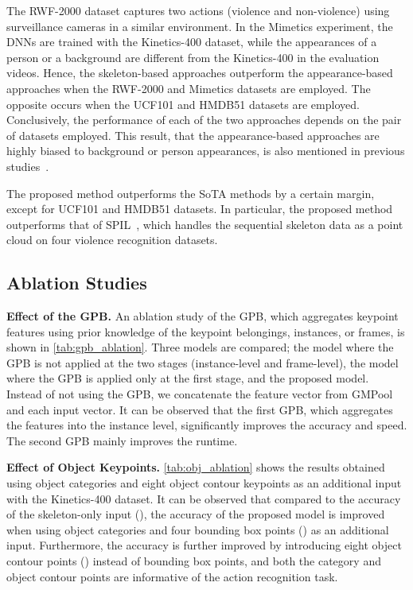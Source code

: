 \documentclass[10pt,twocolumn,letterpaper]{article}
\begin{document}
The RWF-2000 dataset captures two actions (violence and non-violence) using surveillance cameras in a similar environment.
In the Mimetics experiment, the DNNs are trained with the Kinetics-400 dataset, while the appearances of a person or a background are different from the Kinetics-400 in the evaluation videos.
Hence, the skeleton-based approaches outperform the appearance-based approaches when the RWF-2000 and Mimetics datasets are employed. The opposite occurs when the UCF101 and HMDB51 datasets are employed.
Conclusively, the performance of each of the two approaches depends on the pair of datasets employed.
This result, that the appearance-based approaches are highly biased to background or person appearances, is also mentioned in previous studies~\cite{Choi2019Neurips,Weinzaepfel2021IJCV,Moon2021CVPR}.

The proposed method outperforms the SoTA methods by a certain margin, except for UCF101 and HMDB51 datasets.
In particular, the proposed method outperforms that of SPIL~\cite{Su2020ECCV}, which handles the sequential skeleton data as a point cloud on four violence recognition datasets.

\subsection{Ablation Studies}
\label{sec:ablation}

\noindent \textbf{Effect of the GPB.}
An ablation study of the GPB, which aggregates keypoint features using prior knowledge of the keypoint belongings, instances, or frames, is shown in \cref{tab:gpb_ablation}.
Three models are compared; the model where the GPB is not applied at the two stages (instance-level and frame-level), the model where the GPB is applied only at the first stage, and the proposed model.
Instead of not using the GPB, we concatenate the feature vector from GMPool and each input vector.
It can be observed that the first GPB, which aggregates the features into the instance level, significantly improves the accuracy and speed.
The second GPB mainly improves the runtime.

\noindent \textbf{Effect of Object Keypoints.}
\cref{tab:obj_ablation} shows the results obtained using object categories and eight object contour keypoints as an additional input with the Kinetics-400 dataset.
It can be observed that compared to the accuracy of the skeleton-only input (), the accuracy of the proposed model is improved when using object categories and four bounding box points () as an additional input.
Furthermore, the accuracy is further improved by introducing eight object contour points () instead of bounding box points, and both the category and object contour points are informative of the action recognition task.
\end{document}
